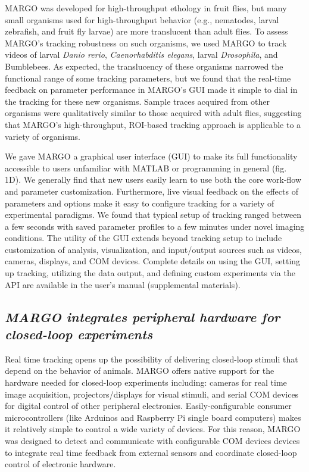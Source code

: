 \documentclass[10pt]{article}
\begin{document}
\begin{multicols}{2}
MARGO was developed for high-throughput ethology in fruit flies, but many small organisms used for high-throughput behavior (e.g., nematodes, larval zebrafish, and fruit fly larvae) are more translucent than adult flies. To assess MARGO’s tracking robustness on such organisms, we used MARGO to track videos of larval \emph{Danio rerio}, \emph{Caenorhabditis elegans}, larval \emph{Drosophila}, and Bumblebees. As expected, the translucency of these organisms narrowed the functional range of some tracking parameters, but we found that the real-time feedback on parameter performance in MARGO's GUI made it simple to dial in the tracking for these new organisms. Sample traces acquired from other organisms were qualitatively similar to those acquired with adult flies, suggesting that MARGO’s high-throughput, ROI-based tracking approach is applicable to a variety of organisms.

We gave MARGO a graphical user interface (GUI) to make its full functionality accessible to users unfamiliar with MATLAB or programming in general (fig. 1D). We generally find that new users easily learn to use both the core work-flow and parameter customization. Furthermore, live visual feedback on the effects of parameters and options make it easy to configure tracking for a variety of experimental paradigms. We found that typical setup of tracking ranged between a few seconds with saved parameter profiles to a few minutes under novel imaging conditions. The utility of the GUI extends beyond tracking setup to include customization of analysis, visualization, and input/output sources such as videos, cameras, displays, and COM devices. Complete details on using the GUI, setting up tracking, utilizing the data output, and defining custom experiments via the API are available in the user's manual (supplemental materials).


\subsection*{\textit{MARGO integrates peripheral hardware for closed-loop experiments}}

Real time tracking opens up the possibility of delivering closed-loop stimuli that depend on the behavior of animals. MARGO offers native support for the hardware needed for closed-loop experiments including: cameras for real time image acquisition, projectors/displays for visual stimuli, and serial COM devices for digital control of other peripheral electronics. Easily-configurable consumer microcontrollers (like Arduinos and Raspberry Pi single board computers) makes it relatively simple to control a wide variety of devices. For this reason, MARGO was designed to detect and communicate with configurable COM devices devices to integrate real time feedback from external sensors and coordinate closed-loop control of electronic hardware. 


\end{multicols}
\end{document}

